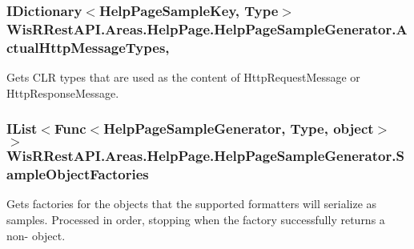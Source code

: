 \subsubsection[{Actual\+Http\+Message\+Types}]{\setlength{\rightskip}{0pt plus 5cm}I\+Dictionary$<${\bf Help\+Page\+Sample\+Key}, Type$>$ Wis\+R\+Rest\+A\+P\+I.\+Areas.\+Help\+Page.\+Help\+Page\+Sample\+Generator.\+Actual\+Http\+Message\+Types\hspace{0.3cm}{\ttfamily [get]}, {\ttfamily [set]}}\label{class_wis_r_rest_a_p_i_1_1_areas_1_1_help_page_1_1_help_page_sample_generator_a00b811b0b4e6e0b530cc3bd254b6427a}


Gets C\+L\+R types that are used as the content of Http\+Request\+Message or Http\+Response\+Message. 

\hypertarget{class_wis_r_rest_a_p_i_1_1_areas_1_1_help_page_1_1_help_page_sample_generator_a1b2dbd19fb879825109b777e58cc89fe}{}
\subsubsection[{Sample\+Object\+Factories}]{\setlength{\rightskip}{0pt plus 5cm}I\+List$<$Func$<${\bf Help\+Page\+Sample\+Generator}, Type, object$>$ $>$ Wis\+R\+Rest\+A\+P\+I.\+Areas.\+Help\+Page.\+Help\+Page\+Sample\+Generator.\+Sample\+Object\+Factories\hspace{0.3cm}{\ttfamily [get]}}\label{class_wis_r_rest_a_p_i_1_1_areas_1_1_help_page_1_1_help_page_sample_generator_a1b2dbd19fb879825109b777e58cc89fe}


Gets factories for the objects that the supported formatters will serialize as samples. Processed in order, stopping when the factory successfully returns a non-\/ object. 

